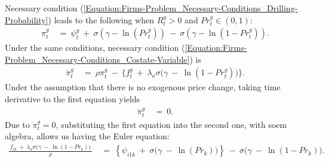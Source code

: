 Necessary condition (\ref{Equation:Firms-Problem_Necessary-Conditions_Drilling-Probability}) leads to the following when $R_{t}^{g} > 0$ and $Pr_{t}^{g} \in (0, 1)$:
\begin{equation*}
\begin{split}
    \pi_{t}^{g} \
    & = \ \psi_{t}^{g} \ + \ \sigma (\gamma - \ln(Pr_{t}^{g})) \ - \ \sigma (\gamma - \ln(1 - Pr_{t}^{g})).
\end{split}
\end{equation*}
Under the same conditions, necessary condition (\ref{Equation:Firms-Problem_Necessary-Conditions_Costate-Variable}) is
\begin{equation*}
\begin{split}
    \dot{\pi}_{t}^{g} \ 
    & = \ \rho \pi_{t}^{g} \ - \ \big\{ f_{t}^{g} \ + \ \lambda_{a} \sigma \big( \gamma \ - \ \ln(1 - Pr_{t}^{g}) \big) \big\}.
\end{split}
\end{equation*}
Under the assumption that there is no exogenous price change, taking time derivative to the first equation yields
\begin{equation*}
\begin{split}
    \dot{\pi}_{t}^{g} \ 
    & = \ 0.
\end{split}
\end{equation*}
Due to $\dot{\pi}_{t}^{g} = 0$, substituting the first equation into the second one, with soem algebra, allows us having the Euler equation:
\begin{equation*}
\begin{split}
    \frac{ \ f_{ik} \ + \ \lambda_{a} \sigma \big( \gamma \ - \ \ln(1 - Pr_{k}) \big) \ }{\rho} \
    & = \ \left\{ \psi_{i1k} \ + \ \sigma \big( \gamma \ - \ \ln(Pr_{k}) \big) \right\} \ - \ \sigma \big( \gamma \ - \ \ln(1 - Pr_{k}) \big).
\end{split}
\end{equation*}